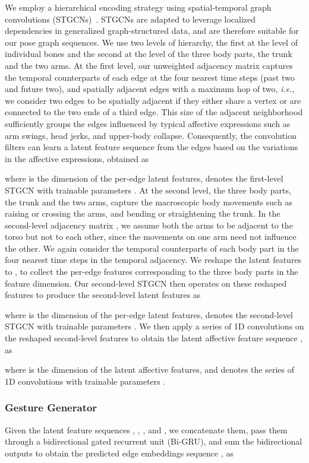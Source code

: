 \documentclass[conference,compsoc]{IEEEtran}
\theoremstyle{definition}
\begin{document}
We employ a hierarchical encoding strategy using spatial-temporal graph convolutions (STGCNs)~\cite{stgcn}. STGCNs are adapted to leverage localized dependencies in generalized graph-structured data, and are therefore suitable for our pose graph sequences. We use two levels of hierarchy, the first at the level of individual bones and the second at the level of the three body parts, the trunk and the two arms. At the first level, our unweighted adjacency matrix  captures the temporal counterparts of each edge at the four nearest time steps (past two and future two), and spatially adjacent edges with a maximum hop of two, \textit{i.e.}, we consider two edges to be spatially adjacent if they either share a vertex or are connected to the two ends of a third edge. This size of the adjacent neighborhood sufficiently groups the edges influenced by typical affective expressions such as arm swings, head jerks, and upper-body collapse. Consequently, the convolution filters can learn a latent feature sequence  from the edges based on the variations in the affective expressions, obtained as

where  is the dimension of the per-edge latent features,  denotes the first-level STGCN with trainable parameters . At the second level, the three body parts, the trunk and the two arms, capture the macroscopic body movements such as raising or crossing the arms, and bending or straightening the trunk. In the second-level adjacency matrix , we assume both the arms to be adjacent to the torso but not to each other, since the movements on one arm need not influence the other. We again consider the temporal counterparts of each body part in the four nearest time steps in the temporal adjacency. We reshape the latent features  to , to collect the per-edge features corresponding to the three body parts in the feature dimension. Our second-level STGCN then operates on these reshaped features to produce the second-level latent features  as

where  is the dimension of the per-edge latent features,  denotes the second-level STGCN with trainable parameters . We then apply a series of 1D convolutions on the reshaped second-level features  to obtain the latent affective feature sequence , as

where  is the dimension of the latent affective features, and  denotes the series of 1D convolutions with trainable parameters .

\subsubsection{Gesture Generator}
Given the latent feature sequences , , , and , we concatenate them, pass them through a bidirectional gated recurrent unit (Bi-GRU), and sum the bidirectional outputs to obtain the predicted edge embeddings sequence , as
\end{document}
